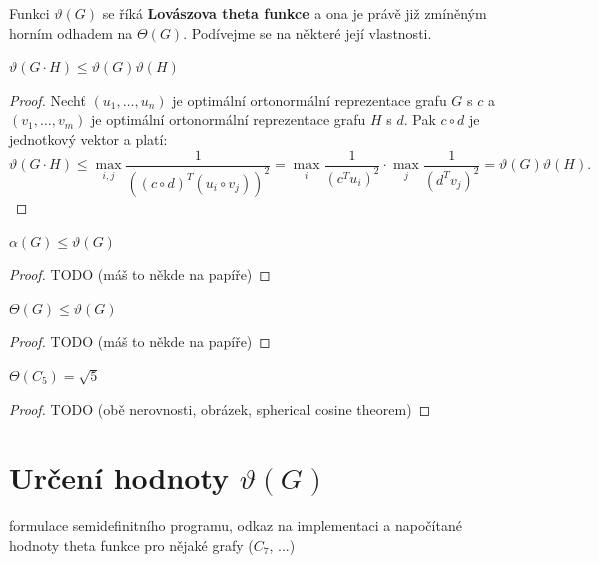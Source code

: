Funkci $\vartheta(G)$ se říká \textbf{Lovászova theta funkce} a ona je právě již zmíněným horním odhadem na $\Theta(G)$. Podívejme se na některé její vlastnosti.

\begin{lm}
    $\vartheta(G \cdot H) \leq \vartheta(G) \vartheta(H)$
\end{lm}

\begin{proof}
    Nechť $\left( u_1, \dots, u_n \right)$ je optimální ortonormální reprezentace grafu $G$ s  $c$ a $\left( v_1, \dots, v_m \right)$ je optimální ortonormální reprezentace grafu $H$ s  $d$. Pak $c \circ d$ je jednotkový vektor a platí:
    $$
        \vartheta(G \cdot H) \leq \max_{i,j} \frac{1}{\left( \left( c \circ d \right)^T \left( u_i \circ v_j \right) \right)^2} = \max_i \frac{1}{\left( c^T u_i \right)^2} \cdot \max_j \frac{1}{\left( d^T v_j \right)^2} = \vartheta(G)\vartheta(H).
    $$
\end{proof}

\begin{lm}
    $\alpha(G) \leq \vartheta(G)$
\end{lm}

\begin{proof}
    TODO (máš to někde na papíře)
\end{proof}

\begin{lm}
    $\Theta(G) \leq \vartheta(G)$
\end{lm}

\begin{proof}
    TODO (máš to někde na papíře)
\end{proof}

\begin{vt}
    $\Theta(C_5) = \sqrt{5}$
\end{vt}

\begin{proof}
    TODO (obě nerovnosti, obrázek, spherical cosine theorem)
\end{proof}

\section{Určení hodnoty $\vartheta(G)$}

formulace semidefinitního programu, odkaz na implementaci a napočítané hodnoty theta funkce pro nějaké grafy ($C_7$, ...)
